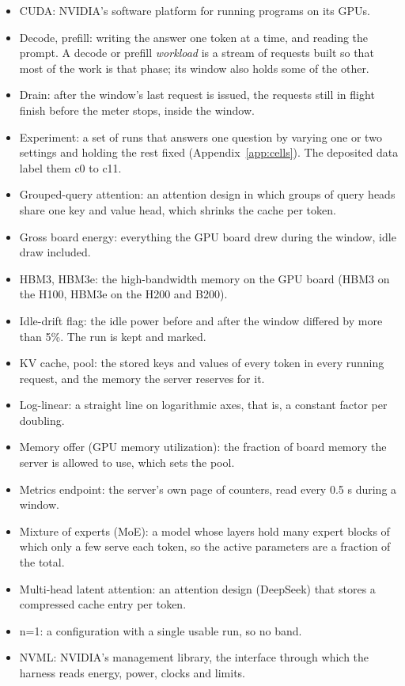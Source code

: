 \documentclass[11pt]{article}
\begin{document}
\begin{small}
\begin{itemize}
\item CUDA: NVIDIA's software platform for running programs on its GPUs.
\item Decode, prefill: writing the answer one token at a time, and reading the prompt. A decode or prefill \emph{workload} is a stream of requests built so that most of the work is that phase; its window also holds some of the other.
\item Drain: after the window's last request is issued, the requests still in flight finish before the meter stops, inside the window.
\item Experiment: a set of runs that answers one question by varying one or two settings and holding the rest fixed (Appendix~\ref{app:cells}). The deposited data label them c0 to c11.
\item Grouped-query attention: an attention design in which groups of query heads share one key and value head, which shrinks the cache per token.
\item Gross board energy: everything the GPU board drew during the window, idle draw included.
\item HBM3, HBM3e: the high-bandwidth memory on the GPU board (HBM3 on the H100, HBM3e on the H200 and B200).
\item Idle-drift flag: the idle power before and after the window differed by more than 5\%. The run is kept and marked.
\item KV cache, pool: the stored keys and values of every token in every running request, and the memory the server reserves for it.
\item Log-linear: a straight line on logarithmic axes, that is, a constant factor per doubling.
\item Memory offer (GPU memory utilization): the fraction of board memory the server is allowed to use, which sets the pool.
\item Metrics endpoint: the server's own page of counters, read every 0.5 s during a window.
\item Mixture of experts (MoE): a model whose layers hold many expert blocks of which only a few serve each token, so the active parameters are a fraction of the total.
\item Multi-head latent attention: an attention design (DeepSeek) that stores a compressed cache entry per token.
\item n=1: a configuration with a single usable run, so no band.
\item NVML: NVIDIA's management library, the interface through which the harness reads energy, power, clocks and limits.

\end{itemize}
\end{small}
\end{document}
